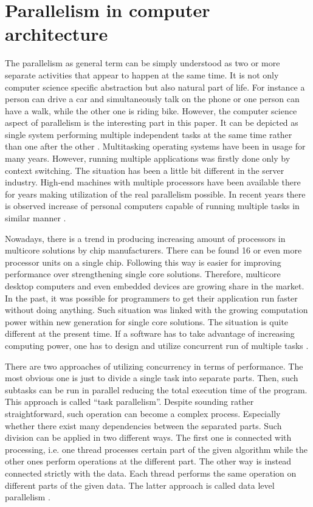 \section{Parallelism in computer architecture}

The parallelism as general term can be simply understood as two or more separate activities
that appear to happen at the same time. It is not only computer science specific abstraction
but also natural part of life. For instance a person can drive a car and simultaneously
talk on the phone or one person can have a walk, while the other one is riding bike.
However, the computer science aspect of parallelism is the interesting part in this paper.
It can be depicted as single system performing multiple independent tasks at the same time
rather than one after the other \cite{cpp_concurrency}. Multitasking operating systems have been
in usage for many years. However, running multiple applications was firstly done only by context switching.
The situation has been a little bit different in the server industry. High-end machines with multiple processors
have been available there for years making utilization of the real parallelism possible.
In recent years there is observed increase of personal computers capable of running multiple tasks
in similar manner \cite{cpp_concurrency}.

Nowadays, there is a trend in producing increasing amount of processors in multicore solutions by chip manufacturers.
There can be found 16 or even more processor units on a single chip. Following this way is easier
for improving performance over strengthening single core solutions. Therefore, multicore desktop
computers and even embedded devices are growing share in the market. In the past, it was possible
for programmers to get their application run faster without doing anything. Such situation
was linked with the growing computation power within new generation for single core solutions. 
The situation is quite different at the present time. If a software has to take advantage of
increasing computing power, one has to design and utilize concurrent run of multiple tasks \cite{cpp_concurrency}.

There are two approaches of utilizing concurrency in terms of performance. The most obvious one
is just to divide a single task into separate parts. Then, such subtasks can be run in parallel
reducing the total execution time of the program. This approach is called ``task parallelism''.
Despite sounding rather straightforward, such operation can become a complex process.
Especially whether there exist many dependencies between the separated parts. Such division
can be applied in two different ways. The first one is connected with processing, i.e.
one thread processes certain part of the given algorithm while the other ones perform operations
at the different part. The other way is instead connected strictly with the data. Each thread
performs the same operation on different parts of the given data. The latter approach is called
data level parallelism \cite{cpp_concurrency}.

